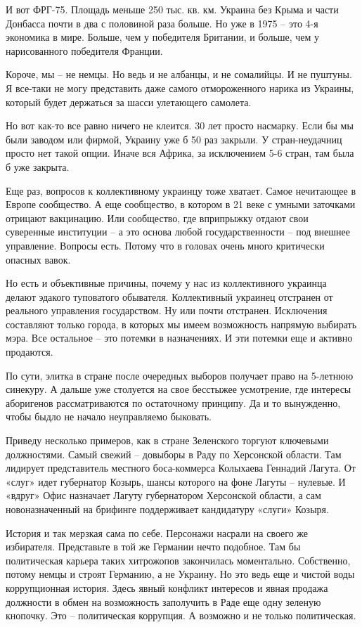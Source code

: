 И вот ФРГ-75. Площадь меньше 250 тыс. кв. км. Украина без Крыма и части
Донбасса почти в два с половиной раза больше. Но уже в 1975 – это 4-я экономика
в мире. Больше, чем у победителя Британии, и больше, чем у нарисованного
победителя Франции.

Короче, мы – не немцы. Но ведь и не албанцы, и не сомалийцы. И не пуштуны. Я
все-таки не могу представить даже самого отмороженного нарика из Украины,
который будет держаться за шасси улетающего самолета.

Но вот как-то все равно ничего не клеится. 30 лет просто насмарку. Если бы мы
были заводом или фирмой, Украину уже б 50 раз закрыли. У стран-неудачниц просто
нет такой опции. Иначе вся Африка, за исключением 5-6 стран, там была б уже
закрыта.

Еще раз, вопросов к коллективному украинцу тоже хватает. Самое нечитающее в
Европе сообщество. А еще сообщество, в котором в 21 веке с умными заточками
отрицают вакцинацию. Или сообщество, где вприпрыжку отдают свои суверенные
институции – а это основа любой государственности – под внешнее управление.
Вопросы есть. Потому что в головах очень много критически опасных вавок.

Но есть и объективные причины, почему у нас из коллективного украинца делают
эдакого туповатого обывателя. Коллективный украинец отстранен от реального
управления государством. Ну или почти отстранен. Исключения составляют только
города, в которых мы имеем возможность напрямую выбирать мэра. Все остальное –
это потемки в назначениях. И эти потемки еще и активно продаются.

По сути, элитка в стране после очередных выборов получает право на 5-летнюю
синекуру. А дальше уже столуется на свое бесстыжее усмотрение, где интересы
аборигенов рассматриваются по остаточному принципу. Да и то вынужденно, чтобы
быдло не начало неуправляемо быковать.

Приведу несколько примеров, как в стране Зеленского торгуют ключевыми
должностями. Самый свежий – довыборы в Раду по Херсонской области. Там лидирует
представитель местного боса-коммерса Колыхаева Геннадий Лагута. От «слуг» идет
губернатор Козырь, шансы которого на фоне Лагуты – нулевые. И «вдруг» Офис
назначает Лагуту губернатором Херсонской области, а сам новоназначенный на
брифинге поддерживает кандидатуру «слуги» Козыря.

История и так мерзкая сама по себе. Персонажи насрали на своего же избирателя.
Представьте в той же Германии нечто подобное. Там бы политическая карьера таких
хитрожопов закончилась моментально. Собственно, потому немцы и строят Германию,
а не Украину. Но это ведь еще и чистой воды коррупционная история. Здесь явный
конфликт интересов и явная продажа должности в обмен на возможность заполучить
в Раде еще одну зеленую кнопочку. Это – политическая коррупция. А возможно и не
только политическая.

